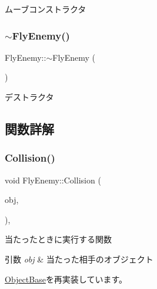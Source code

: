 ムーブコンストラクタ 

\mbox{\label{class_fly_enemy_ae4345f89a659b559c08d0bb879db7158}} 
\subsubsection{\texorpdfstring{$\sim$\+Fly\+Enemy()}{~FlyEnemy()}}
{\footnotesize\ttfamily Fly\+Enemy\+::$\sim$\+Fly\+Enemy (\begin{DoxyParamCaption}{ }\end{DoxyParamCaption})\hspace{0.3cm}{\ttfamily [inline]}}



デストラクタ 



\subsection{関数詳解}
\mbox{\label{class_fly_enemy_adaabf7ce270104e30df29bfa464d72ce}} 
\subsubsection{\texorpdfstring{Collision()}{Collision()}}
{\footnotesize\ttfamily void Fly\+Enemy\+::\+Collision (\begin{DoxyParamCaption}\item[{\mbox{\hyperlink{class_object_base}{Object\+Base}} $\ast$}]{obj,  }\item[{\mbox{\hyperlink{common_8h_afb0c5e21d4133ff4f200992c0b534e1b}{V\+E\+C2}}}]{ }\end{DoxyParamCaption})\hspace{0.3cm}{\ttfamily [final]}, {\ttfamily [virtual]}}



当たったときに実行する関数 


\begin{DoxyParams}{引数}
{\em obj} & 当たった相手のオブジェクト \\
\hline
\end{DoxyParams}


\mbox{\hyperlink{class_object_base_ad772d7a42f5e46c39481f5db22ee8193}{Object\+Base}}を再実装しています。

